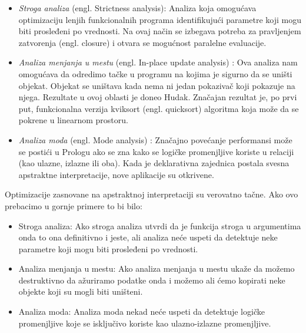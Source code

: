 \begin{itemize}
\item \textit{Stroga analiza} (engl. Strictness analysis\cite{AbramskyHankin}):
Analiza koja omogućava optimizaciju lenjih funkcionalnih programa identifikujući parametre koji mogu biti prosleđeni po vrednosti. Na ovaj način se izbegava potreba za pravljenjem zatvorenja (engl. closure) i otvara se mogućnost paralelne evaluacije. 

\item \textit{Analiza menjanja u mestu} (engl. In-place update analysis) \cite{CannPhd}:
Ova analiza nam omogućava da odredimo tačke u programu na kojima je sigurno da se uništi objekat. Objekat se uništava kada nema ni jedan pokazivač koji pokazuje na njega. Rezultate u ovoj oblasti je doneo Hudak. Značajan rezultat je, po prvi put, funkcionalna verzija kviksort (engl. quicksort) algoritma koja može da se pokrene u linearnom prostoru. \cite{Girard1987}


\item \textit{Analiza moda} (engl. Mode analysis) \cite{AbramskyHankin}:
Značajno povećanje performansi može se postići u Prologu ako se zna kako se logičke promenjljive koriste u relaciji (kao ulazne, izlazne ili oba).
Kada je deklarativna zajednica postala svesna apstraktne interpretacije, nove aplikacije su otkrivene. 

\end{itemize}
Optimizacije zasnovane na apstraktnoj interpretaciji su verovatno tačne. Ako ovo prebacimo u gornje primere to bi bilo:

\begin{itemize}
\item Stroga analiza:
Ako stroga analiza utvrdi da je funkcija stroga u argumentima onda to ona definitivno i jeste, ali analiza neće uspeti da detektuje neke parametre koji mogu biti prosleđeni po vrednosti. 

\item Analiza menjanja u mestu:
Ako analiza menjanja u mestu ukaže da možemo destruktivno da ažuriramo podatke onda i možemo ali ćemo kopirati neke objekte koji su mogli biti uništeni. \cite{Girard1987}


\item Analiza moda:
Analiza moda nekad neće uspeti da detektuje logičke promenjljive koje se isključivo koriste kao ulazno-izlazne promenjljive. 

\end{itemize}

